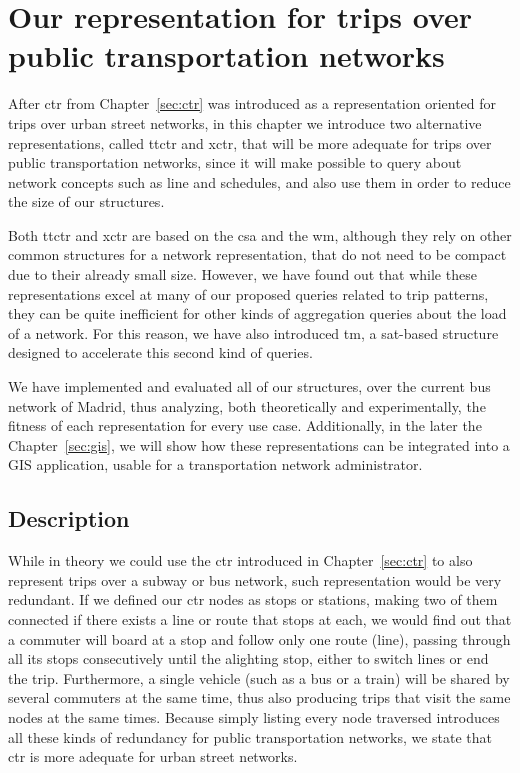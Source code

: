 \chapter{Our representation for trips over public transportation networks}
\label{sec:newctr}

	After \gls{ctr} from Chapter~\ref{sec:ctr} was introduced as a representation oriented for trips over urban street networks, in this chapter we introduce two alternative representations, called \gls{ttctr} and \gls{xctr}, that will be more adequate for trips over public transportation networks, since it will make possible to query about network concepts such as line and schedules, and also use them in order to reduce the size of our structures.
	
	Both \gls{ttctr} and \gls{xctr} are based on the \gls{csa}  and the \gls{wm}, although they rely on other common structures for a network representation, that do not need to be compact due to their already small size. However, we have found out that while these representations excel at many of our proposed queries related to trip patterns, they can be quite inefficient for other kinds of aggregation queries about the load of a network. For this reason, we have also introduced \gls{tm}, a \gls{sat}-based structure designed to accelerate this second kind of queries.
	
	We have implemented and evaluated all of our structures, over the current bus network of Madrid, thus analyzing, both theoretically and experimentally, the fitness of each representation for every use case. Additionally, in the later the Chapter~\ref{sec:gis}, we will show how these representations can be integrated into a GIS application, usable for a transportation network administrator.
	
\section{Description}
    \label{sec:newctr:desc}
	While in theory we could use the \gls{ctr} introduced in Chapter~\ref{sec:ctr} to also represent trips over a subway or bus network, such representation would be very redundant. If we defined our \gls{ctr} nodes as stops or stations, making two of them connected if there exists a line or route that stops at each, we would find out that a commuter will board at a stop and follow only one route (line), passing through all its stops consecutively until the alighting stop, either to switch lines or end the trip. Furthermore, a single vehicle (such as a bus or a train) will be shared by several commuters at the same time, thus also producing trips that visit the same nodes at the same times. Because simply listing every node traversed introduces all these kinds of redundancy for public transportation networks, we state that \gls{ctr} is more adequate for urban street networks.
	
